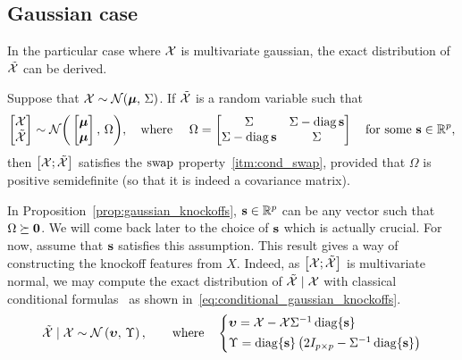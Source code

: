 \subsection{Gaussian case}\label{subsec:gaussian_knockoffs}

In the particular case where $\mathcal{X}$ is multivariate gaussian, the exact distribution of $\tilde{\mathcal{X}}$ can be derived.
\begin{proposition}
    \label{prop:gaussian_knockoffs}
    Suppose that $\mathcal{X} \sim \mathcal{N}(\bm{\mu},\, \Sigma)$.
    If $\tilde{\mathcal{X}}$ is a random variable such that
    \begin{equation*}
        \begin{bmatrix} \mathcal{X}\\ \tilde{\mathcal{X}} \end{bmatrix} \sim \mathcal{N}\bigg(\begin{bmatrix} \bm{\mu}\\ \bm{\mu} \end{bmatrix},\, \Omega\bigg)
        ,\quad\text{where }\quad
        \Omega = \begin{bmatrix}
            \Sigma & \Sigma - \operatorname*{diag} \mathbf{s}\\
            \Sigma - \operatorname*{diag} \mathbf{s} & \Sigma
        \end{bmatrix}
        \quad\text{for some }
        \mathbf{s} \in \mathbb{R}^p,
    \end{equation*}
    then $\big[\mathcal{X}; \tilde{\mathcal{X}} \big]$ satisfies the $\operatorname{swap}$ property~\ref{itm:cond_swap},
    provided that $\Omega$ is positive semidefinite (so that it is indeed a covariance matrix).
\end{proposition}
In Proposition~\ref{prop:gaussian_knockoffs},
$\mathbf{s} \in \mathbb{R}^p$ can be any vector such that $\Omega \succeq \mathbf{0}$.
We will come back later to the choice of $\mathbf{s}$ which is actually crucial.
For now, assume that $\mathbf{s}$ satisfies this assumption.
This result gives a way of constructing the knockoff features from $X$.
Indeed, as $\big[ \mathcal{X}; \tilde{\mathcal{X}} \big]$ is multivariate normal, we may compute the exact distribution of
$\tilde{\mathcal{X}} \mid \mathcal{X}$ with classical conditional formulas~\citep{conditional_normal}
as shown in~\ref{eq:conditional_gaussian_knockoffs}.
\begin{equation}\label{eq:conditional_gaussian_knockoffs}
    \tcX \mid \cX \sim \cN\left( \bupsilon,\, \Upsilon \right)
    ,\qquad\text{where}\quad
    \begin{cases*}
        \bupsilon = \cX - \cX\Sigma^{-1}\diag\{ \bs \}\\
        \Upsilon = \diag\{ \bs \} \left( 2I_{p \times p} - \Sigma^{-1}\diag\{ \bs \} \right)
    \end{cases*}
\end{equation}
